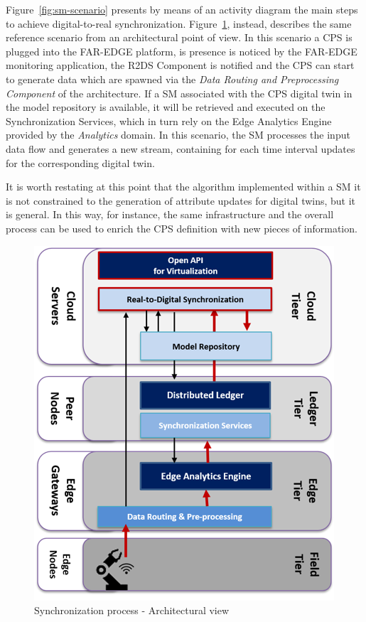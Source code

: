 Figure~\ref{fig:sm-scenario} presents by means of an activity diagram the main steps to achieve digital-to-real synchronization. Figure~\ref{fig:r2ds}, instead, describes the same reference scenario from an architectural point of view. In this scenario a CPS is plugged into the FAR-EDGE platform, is presence is noticed by the FAR-EDGE monitoring application, the R2DS Component is notified and the CPS can start to generate data which are spawned via the \textit{Data Routing and Preprocessing Component} of the architecture. 
If a SM associated with the CPS digital twin in the model repository is available, it will be retrieved and executed on the Synchronization Services, which in turn rely on the Edge Analytics Engine provided by the \textit{Analytics} domain. 
In this scenario, the SM processes the input data flow and generates a new stream, containing for each time interval updates for the corresponding digital twin. 

It is worth restating at this point that the algorithm implemented within a SM it is not constrained to the generation of attribute updates for digital twins, but it is general. In this way, for instance, the same infrastructure and the overall process can be used to enrich the CPS definition with new pieces of information. 

\begin{figure}
	\centering
	\includegraphics[width=0.7\linewidth]{images/R2DS}
	\caption{Synchronization process - Architectural view}
	\label{fig:r2ds}
\end{figure}


